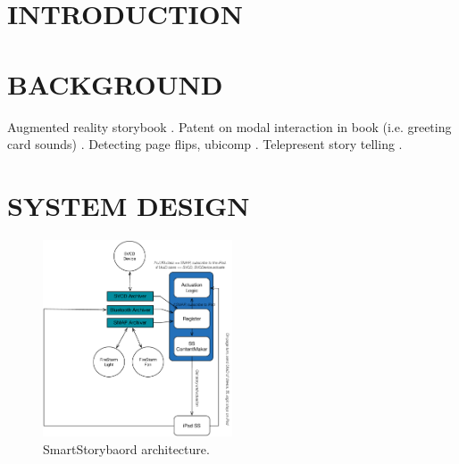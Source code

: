 \documentclass{sigchi}
\newcommand\namesp{SmartStorybaord }
\begin{document}
\section{INTRODUCTION}
\lipsum[2]
   

\section{BACKGROUND}
Augmented reality storybook \cite{scherrer_haunted_2008}. 
Patent on modal interaction in book (i.e. greeting card sounds) \cite{iggulden_printed_1999}. 
Detecting page flips, ubicomp \cite{fujinami_page-flipping_2009}.
Telepresent story telling \cite{raffle_family_2010}. 


\section{SYSTEM DESIGN}
  \begin{figure}[t!]
      \centering
      \includegraphics[keepaspectratio, width=0.5\textwidth]{figures/architecture.pdf} 
      \caption{\namesp architecture. }
      \vspace{-4pt}
      \label{fig:architecture} 
    \end{figure}

\lipsum[3]

\end{document}
